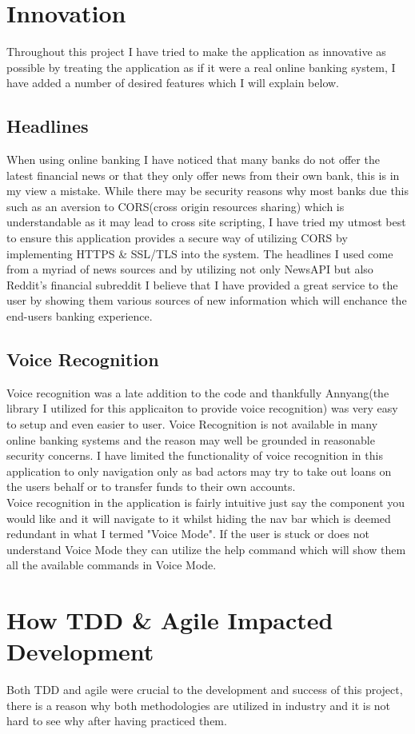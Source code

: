 \section{Innovation}
Throughout this project I have tried to make the application as innovative as possible by treating the application as if it were a real online banking system, I have added a number of desired features which I will explain below.
\subsection{Headlines}
When using online banking I have noticed that many banks do not offer the latest financial news or that they only offer news from their own bank, this is in my view a mistake.  While there may be security reasons why most banks due this such as an aversion to CORS(cross origin resources sharing) which is understandable as it may lead to cross site scripting,  I have tried my utmost best to ensure this application provides a secure way of utilizing CORS by implementing HTTPS \& SSL/TLS into the system.  The headlines I used come from a myriad of news sources and by utilizing not only NewsAPI but also Reddit's financial subreddit I believe that I have provided a great service to the user by showing them various sources of new information which will enchance the end-users banking experience.
\subsection{Voice Recognition}
Voice recognition was a late addition to the code and thankfully Annyang(the library I utilized for this applicaiton to provide voice recognition)\cite{Annyang} was very easy to setup and even easier to user.  Voice Recognition is not available in many online banking systems and the reason may well be grounded in reasonable security concerns.  I have limited the functionality of voice recognition in this application to only navigation only as bad actors may try to take out loans on the users behalf or to transfer funds to their own accounts.
\\
Voice recognition in the application is fairly intuitive just say the component you would like and it will navigate to it whilst hiding the nav bar which is deemed redundant in what I termed "Voice Mode".  If the user is stuck or does not understand Voice Mode they can utilize the help command which will show them all the available commands in Voice Mode.
\section{How TDD \& Agile Impacted Development}
Both TDD and agile were crucial to the development and success of this project, there is a reason why both methodologies are utilized in industry and it is not hard to see why after having practiced them.
